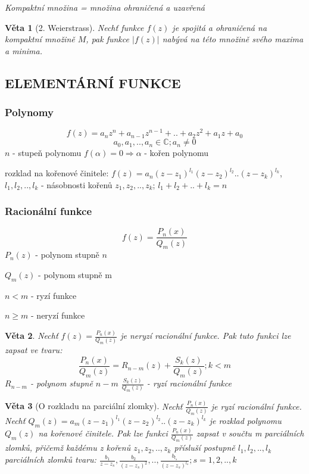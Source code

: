 \documentclass[a4]{report}
\newtheorem{theorem}{Věta}
\theoremstyle{definition}
\begin{document}
\textit{Kompaktní množina = množina ohraničená a uzavřená}

\begin{theorem}[2. Weierstrass]
Nechť funkce $f(z)$ je spojitá a ohraničená na kompaktní množině $M$, pak funkce $|f(z)|$ nabývá na této množině svého maxima a minima.
\end{theorem}

\subsection{ELEMENTÁRNÍ FUNKCE}

\subsubsection{Polynomy}
$$f(z)=a_nz^n+a_{n-1}z^{n-1}+..+a_2z^2+a_1z+a_0$$
$$a_0,a_1,..,a_n\in\mathbb{C}; a_n\neq0$$
$n$ - stupeň polynomu
$f(\alpha)=0 \Rightarrow \alpha$ - kořen polynomu

rozklad na kořenové činitele: $f(z)=a_n(z-z_1)^{l_1}(z-z_2)^{l_2}..(z-z_k)^{l_k}$, $l_1,l_2,..,l_k$ - násobnosti kořenů $z_1,z_2,..,z_k$; $l_1+l_2+..+l_k=n$

\subsubsection{Racionální funkce}
$$f(z)=\frac{P_n(x)}{Q_m(z)}$$
$P_n(z)$ - polynom stupně $n$

$Q_m(z)$ - polynom stupně m

$n<m$ - ryzí funkce

$n\geq m$ - neryzí funkce

\begin{theorem}
Nechť $f(z)=\frac{P_n(x)}{Q_m(z)}$ je neryzí racionální funkce. Pak tuto funkci lze zapsat ve tvaru: $$\frac{P_n(x)}{Q_m(z)}=R_{n-m}(z)+\frac{S_k(z)}{Q_m(z)}; k<m$$
$R_{n-m}$ - polynom stupně $n-m$
$\frac{S_k(z)}{Q_m(z)}$ - ryzí racionální funkce
\end{theorem}

%

\begin{theorem}[O rozkladu na parciální zlomky]
Nechť $\frac{P_n(x)}{Q_m(z)}$ je ryzí racionální funkce. Nechť $Q_m(z)=a_m(z-z_1)^{l_1}(z-z_2)^{l_2}..(z-z_k)^{l_k}$ je rozklad polynomu $Q_m(z)$ na kořenové činitele. Pak lze funkci $\frac{P_n(x)}{Q_m(z)}$ zapsat v součtu m parciálních zlomků, přičemž každému z kořenů $z_1,z_2,..,z_k$ přísluší postupně $l_1,l_2,..,l_k$ parciálních zlomků tvaru: $\frac{b_1}{z-z_s},\frac{b_2}{(z-z_s)^2},..,\frac{b_{l_s}}{(z-z_s)^{l_s}}; s=1,2,..,k$
\end{theorem}
\end{document}
